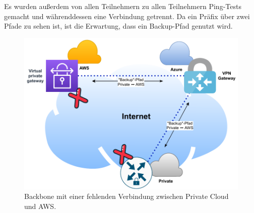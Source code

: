 Es wurden außerdem von allen Teilnehmern zu allen Teilnehmern Ping-Tests gemacht und währenddessen eine Verbindung getrennt. Da ein Präfix über zwei Pfade zu sehen ist, ist die Erwartung, dass ein Backup-Pfad genutzt wird.\\

\begin{figure}[h]
  \centering
  \includegraphics{Figures/Use-Case-1_Basis_Deployment_missing_link.pdf}
  \caption{Backbone mit einer fehlenden Verbindung zwischen Private Cloud und AWS.}
  \label{grafik:Use-Case-1_Basis_Deployment_missing_link}
\end{figure}\FloatBarrier

